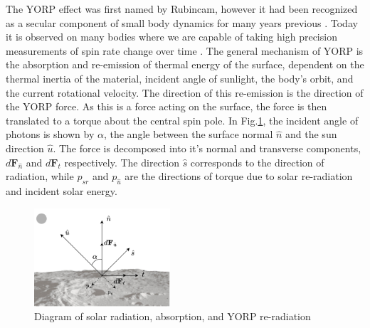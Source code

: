 The YORP effect was first named by Rubincam, however it had been recognized as a secular component of small body dynamics for many years previous \cite{Rubincam2000}. Today it is observed on many bodies where we are capable of taking high precision measurements of spin rate change over time \cite{Lowry2007}. The general mechanism of YORP is the absorption and re-emission of thermal energy of the surface, dependent on the thermal inertia of the material, incident angle of sunlight, the body's orbit, and the current rotational velocity. The direction of this re-emission is the direction of the YORP force. As this is a force acting on the surface, the force is then translated to a torque about the central spin pole. In Fig.\ref{fig:surface_diagram}, the incident angle of photons is shown by $\alpha$, the angle between the surface normal $\hat{n}$ and the sun direction $\hat{u}$. The force is decomposed into it's normal and transverse components, $d\textbf{F}_{\hat{n}}$ and $d\textbf{F}_t$ respectively. The direction $\hat{s}$ corresponds to the direction of radiation, while $p_{sr}$ and $p_{\hat{u}}$ are the directions of torque due to solar re-radiation and incident solar energy. 
\begin{figure}
    \centering
    \includegraphics[width=0.45\textwidth]{fig/yorp.jpeg}
    \caption{Diagram of solar radiation, absorption, and YORP re-radiation}
    \label{fig:surface_diagram}
\end{figure}

